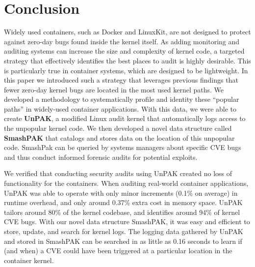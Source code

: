 \section{Conclusion}
\label{sec.conclusion}
Widely used containers, such as Docker and LinuxKit, are not designed to protect against zero-day bugs found inside the kernel itself. 
As adding monitoring and auditing systems can increase the size and complexity of kernel code, a targeted strategy that effectively identifies the best places to audit is highly desirable. 
This is particularly true in container systems, which are designed to be lightweight. 
In this paper we introduced such a strategy that leverages previous findings \cite{Lock-in-Pop} that fewer zero-day kernel bugs are located in the most used kernel paths. 
We developed a methodology to systematically profile and identity these ``popular paths'' in widely-used container applications. 
With this data, we were able to create \textbf{UnPAK}, a modified Linux audit kernel that automatically logs access to the unpopular kernel code. 
We then developed a novel data structure called \textbf{SmashPAK} that catalogs and stores data on the location of this unpopular code. 
SmashPak can be queried by systems managers about specific CVE bugs and thus conduct informed forensic audits for potential exploits. 

We verified that conducting security audits using UnPAK created no loss of functionality for the containers. When auditing real-world container applications, 
UnPAK was able to operate with only minor increments (0.1\% on average) in runtime overhead, and only around 0.37\% extra cost in memory space. 
UnPAK tailors around 80\% of the kernel codebase, and identifies around 94\% of kernel CVE bugs. 
With our novel data structure SmashPAK, it was easy and efficient to store, update, and search for kernel logs. 
The logging data gathered by UnPAK and stored in SmashPAK can be searched in as little as 0.16 seconds to learn if (and when) a CVE could have been triggered at a particular location in the container kernel. 